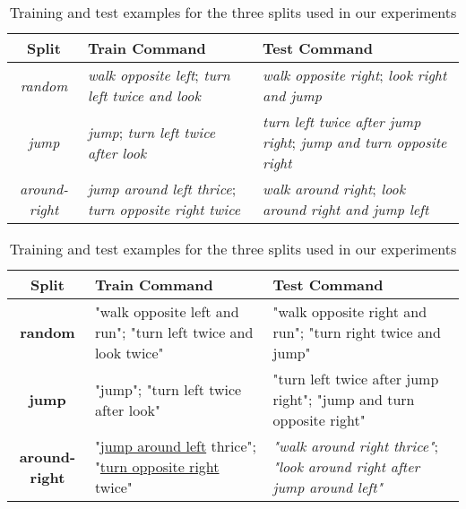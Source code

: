 \begin{table}[t!]
    \footnotesize
    \begin{center}
      \begin{tabular}{| c | p{2.2cm} | p{2.2cm} |}
            \hline \textbf{Split} & \textbf{Train Command} & \textbf{Test Command} \\ \hline
            \textit{random} & \textit{walk opposite left}; \textit{turn left twice and look} & 
                \textit{walk opposite right}; \textit{look right and jump}  \\
            \hline
            \textit{jump} & \textit{jump}; \textit{turn left twice after look}  & 
            \textit{turn left twice after jump right}; \textit{jump and turn opposite right} \\
            \hline
            \textit{around-right} & \textit{jump around left thrice}; \textit{turn opposite right twice} & \textit{walk around right};
            \textit{look around right and jump left} \\
            \hline
        \end{tabular} 
    \end{center}
    \caption{\label{table:examples} Training and test examples for the three splits used in our experiments }
\end{table}

\iffalse
\begin{table}[t!]
    \footnotesize
    \begin{center}
        \begin{tabular}{| c | p{2.2cm} | p{2.2cm} |}
            \hline \textbf{Split} & \textbf{Train Command} & \textbf{Test Command} \\ \hline
            \textbf{random} & "walk opposite left and run"; "turn left twice and look twice" & 
                "walk opposite right and run"; "turn right twice and jump"  \\
            \hline
            \textbf{jump} & "jump"; "turn left twice after look"  & 
            "turn left twice after jump right"; "jump and turn opposite right" \\
            \hline
            \textbf{around-right} & "\underline{jump around left} thrice"; "\underline{turn opposite right} twice" & \textit{"walk around right thrice"};
            \textit{"look around right after jump around left"} \\
            \hline
        \end{tabular} 
    \end{center}
    \caption{\label{table:examples} Training and test examples for the three splits used in our experiments }
\end{table}

